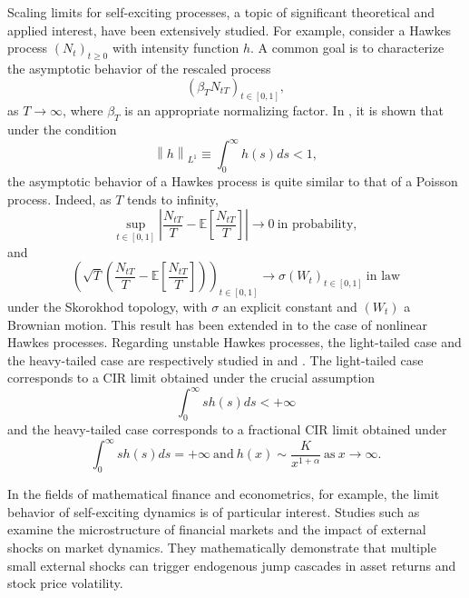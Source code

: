 \documentclass[letterpaper]{article}
\numberwithin{equation}{section}
\theoremstyle{definition}
\theoremstyle{remark}
\newcommand{\norm}[1]{\left\lVert#1\right\rVert}
\begin{document}
Scaling limits for self-exciting processes, a topic of significant theoretical and applied interest, have been extensively studied. For example, consider a Hawkes process $(N_t)_{t\ge0}$ with intensity function $h$. A common goal is to characterize the asymptotic behavior of the rescaled process 
\[
  (\beta_T N_{tT})_{t\in[0,1]},
\]
as $T\rightarrow\infty$, where $\beta_T$ is an appropriate normalizing factor. In \cite{bacry2013some}, it is shown that under the condition
\[
  \norm h_{L^1}\equiv\int_0^\infty h(s)ds<1,
\]
the asymptotic behavior of a Hawkes process is quite similar to that of a Poisson process. Indeed, as $T$ tends to infinity,
\[
  \sup_{t\in[0,1]}\left| \frac{N_{tT}}{T}-\mathbb E\left[ \frac{N_{tT}}{T} \right] \right|\rightarrow 0\ \text{in probability},
\]
and
\[
  \left( \sqrt T\left( \frac{N_{tT}}{T}-\mathbb E\left[ \frac{N_{tT}}{T} \right] \right) \right)_{t\in[0,1]}\rightarrow \sigma(W_t)_{t\in[0,1]}\ \text{in law}
\]
under the Skorokhod topology, with $\sigma$ an explicit constant and $(W_t)$ a Brownian motion. This result has been extended in \cite{zhu2013nonlinear} to the case of nonlinear Hawkes processes. Regarding unstable Hawkes processes, the light-tailed case and the heavy-tailed case are respectively studied in \cite{jaisson2015limit} and \cite{jaisson2016rough}. The light-tailed case corresponds to a CIR limit obtained under the crucial assumption
\[
  \int_0^\infty sh(s)ds<+\infty
\]
and the heavy-tailed case corresponds to a fractional CIR limit obtained under
\[
  \int_0^\infty sh(s)ds=+\infty\ \text{and}\ h(x)\sim \frac{K}{x^{1+\alpha}}\ \text{as}\ x\rightarrow\infty.
\]

In the fields of mathematical finance and econometrics, for example, the limit behavior of self-exciting dynamics is of particular interest. Studies such as \cite{horst2019scaling, horst2022microstructure} examine the microstructure of financial markets and the impact of external shocks on market dynamics. They mathematically demonstrate that multiple small external shocks can trigger endogenous jump cascades in asset returns and stock price volatility.
\end{document}
